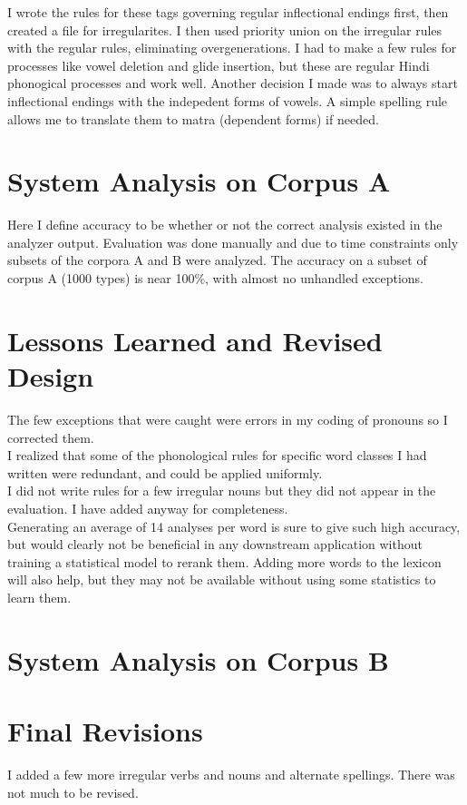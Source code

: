 \documentclass[11pt,letterpaper]{article}
\begin{document}
I wrote the rules for these tags governing regular inflectional endings first, then created a file for irregularites. I then used priority union on the irregular rules with the regular rules, eliminating overgenerations. I had to make a few rules for processes like vowel deletion and glide insertion, but these are regular Hindi phonogical processes and work well. Another decision I made was to always start inflectional endings with the indepedent forms of vowels. A simple spelling rule allows me to translate them to matra (dependent forms) if needed.

\section{System Analysis on Corpus A}
Here I define accuracy to be whether or not the correct analysis existed in the analyzer output. Evaluation was done manually and due to time constraints only subsets of the corpora A and B were analyzed. The accuracy on a subset of corpus A (1000 types) is near 100\%, with almost no unhandled exceptions.
\section{Lessons Learned and Revised Design}
The few exceptions that were caught were errors in my coding of pronouns so I corrected them.\\
I realized that some of the phonological rules for specific word classes I had written were redundant, and could be applied uniformly. \\
I did not write rules for a few irregular nouns but they did not appear in the evaluation. I have added anyway for completeness.\\
Generating an average of 14 analyses per word is sure to give such high accuracy, but would clearly not be beneficial in any downstream application without training a statistical model to rerank them. Adding more words to the lexicon will also help, but they may not be available without using some statistics to learn them.
\section{System Analysis on Corpus B}

\section{Final Revisions}
I added a few more irregular verbs and nouns and alternate spellings. There was not much to be revised.
\end{document}
